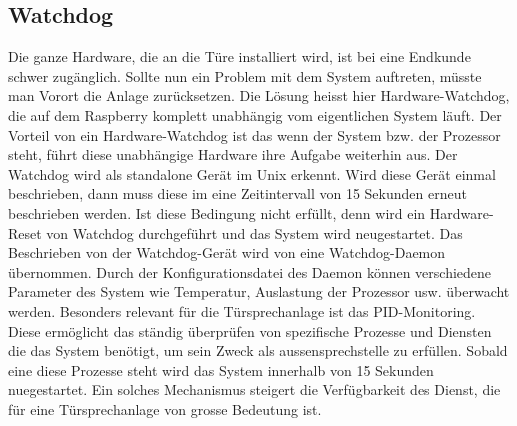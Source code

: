 \subsection{Watchdog}
\label{kap:watchdog}
Die ganze Hardware, die an die Türe installiert wird, ist bei eine Endkunde schwer zugänglich. Sollte nun ein Problem mit dem System auftreten, müsste man Vorort die Anlage zurücksetzen. Die Lösung heisst hier Hardware-Watchdog, die auf dem Raspberry komplett unabhängig vom eigentlichen System läuft. Der Vorteil von ein Hardware-Watchdog ist das wenn der System bzw. der Prozessor steht, führt diese unabhängige Hardware ihre Aufgabe weiterhin aus.
Der Watchdog wird als standalone Gerät im Unix erkennt. Wird diese Gerät einmal beschrieben, dann muss diese im eine Zeitintervall von 15 Sekunden erneut beschrieben werden. Ist diese Bedingung nicht erfüllt, denn wird ein Hardware-Reset von Watchdog durchgeführt und das System wird neugestartet.
Das Beschrieben von der Watchdog-Gerät wird von eine Watchdog-Daemon übernommen. 
Durch der Konfigurationsdatei des Daemon können verschiedene Parameter des System wie Temperatur, Auslastung der Prozessor usw. überwacht werden. Besonders relevant für die Türsprechanlage ist das PID-Monitoring. Diese ermöglicht das ständig überprüfen von spezifische Prozesse und Diensten die das System benötigt, um sein Zweck als \gls{aussensprechstelle} zu erfüllen. Sobald eine diese Prozesse steht wird das System innerhalb von 15 Sekunden nuegestartet. 
Ein solches Mechanismus steigert die Verfügbarkeit des Dienst, die für eine Türsprechanlage von grosse Bedeutung ist.


\newpage